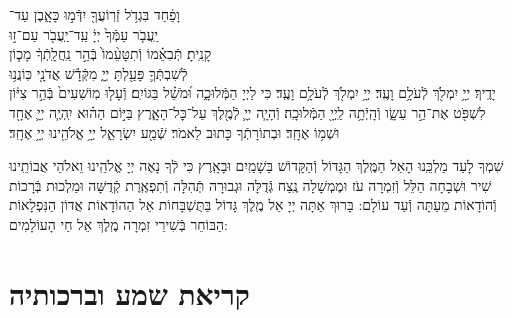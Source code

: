 \documentclass[twoside, openany, parskip=half, 11pt]{book}
\begin{document}
וָפַ֔חַד \hfill בִּגְדֹ֥ל זְֿרֽוֹעֲךָ֖ יִדְּֿמ֣וּ כָּאָ֑בֶן \hfill עַד־\\
יַֽעֲבֹ֤ר עַמְּֿךָ֙ יְיָ֔ \hfill עַֽד־יַֽעֲבֹ֖ר עַם־ז֣וּ \\
קָנִֽיתָ׃ \hfill תְּֿבִאֵ֗מוֹ וְֿתִטָּעֵ֨מוֹ֙ בְּֿהַ֣ר נַֽחֲלָֽתְֿךָ֔ \hfill מָכ֧וֹן \\
לְֿשִׁבְתְּֿךָ֛ פָּעַ֖לְתָּ יְיָ֑ \hfill מִקְּֿדָ֕שׁ אֲדֹנָ֖י כּֽוֹנֲנ֥וּ \\
יָדֶֽיךָ׃ \hfill יְיָ֥ יִמְלֹ֖ךְ לְֿעֹלָ֥ם וָעֶֽד׃\hfill \break
יְיָ֥ יִמְלֹ֖ךְ לְֿעֹלָ֥ם וָעֶֽד׃
כִּי לַיְיָ הַמְּֿלוּכָ֑ה וּ֝מֹשֵׁ֗ל בַּגּוֹיִֽם׃
וְֿעָל֤וּ מֽוֹשִׁעִים֙ בְּֿהַ֣ר צִיּ֔וֹן לִשְׁפֹּ֖ט אֶת־הַ֣ר עֵשָׂ֑ו וְֿהָֽיְֿתָ֥ה לַֽיְיָ֖ הַמְּֿלוּכָֽה׃
וְֿהָיָ֧ה יְיָ֛ לְֿמֶ֖לֶךְ עַל־כׇּל־הָאָ֑רֶץ בַּיּ֣וֹם הַה֗וּא יִֽהְיֶ֧ה יְיָ֛ אֶחָ֖ד וּשְׁמ֥וֹ אֶחָֽד׃
וּבְתוֹרָתְֿךָ כָּתוּב לֵאמֹר׃
שְֿׁמַ֖ע יִשְׂרָאֵ֑ל יְיָ֥ אֱלֹהֵ֖ינוּ יְיָ֥ אֶחָֽד׃



שִׁמְךָ לָעַד מַלְכֵּֽנוּ הָאֵל הַמֶּֽלֶךְ הַגָּדוֹל וְֿהַקָּדוֹשׁ בַּשָׁמַֽיִם וּבָאָֽרֶץ כִּי לְֿךָ נָאֶה יְיָ אֱלֹהֵֽינוּ וֵאלֹהֵי אֲבוֹתֵֽינוּ שִׁיר וּשְׁבָחָה הַלֵּל וְֿזִמְרָה עֹז וּמֶמְשָׁלָה נֶֽצַח גְּֿדֻלָּה וּגְבוּרָה תְּֿהִלָּה וְֿתִפְאֶֽרֶת קְֿדֻשָּׁה וּמַלְכוּת בְּֿרָכוֹת וְֿהוֹדָאוֹת מֵעַתָּה וְֿעַד עוֹלָם: בָּרוּךְ אַתָּה יְיָ אֵל מֶֽלֶךְ גָּדוֹל בַּתֻּשְׁבָּחוֹת אֵל הַהוֹדָאוֹת אֲדוֹן הַנִּפְלָאוֹת הַבּוֹחֵר בְּֿשִׁירֵי זִמְרָה מֶֽלֶךְ אֵל חַי הָעוֹלָמִים:

\halfkaddish

\enlargethispage{\baselineskip}

\vspace{1.25\baselineskip}
{\let\clearpage\relax
\chapter[שחרית לחול]{קריאת שמע וברכותיה}}
\end{document}
